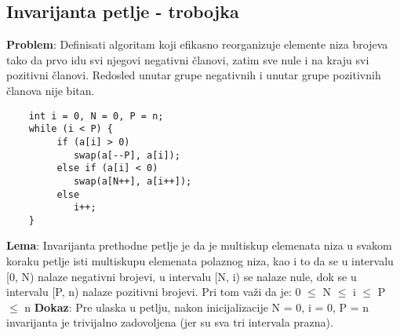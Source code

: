 \documentclass{article}
\begin{document}
\subsection{Invarijanta petlje - trobojka}
\textbf{Problem}: Definisati algoritam koji efikasno reorganizuje elemente niza brojeva tako da prvo idu svi njegovi negativni članovi, zatim sve nule i na kraju svi pozitivni članovi. Redosled unutar grupe negativnih i unutar grupe pozitivnih članova nije bitan. 
\begin{lstlisting}
    int i = 0, N = 0, P = n; 
    while (i < P) { 
	     if (a[i] > 0) 
    		swap(a[--P], a[i]); 
	     else if (a[i] < 0) 
    		swap(a[N++], a[i++]); 
	     else 
    		i++;
    }
\end{lstlisting}
\newline
\textbf{Lema}: Invarijanta prethodne petlje je da je multiskup elemenata niza u svakom koraku petlje isti multiskupu elemenata polaznog niza, kao i to da se u intervalu [0, N) nalaze negativni brojevi, u intervalu [N, i) se nalaze nule, dok se u intervalu [P, n) nalaze pozitivni brojevi. Pri tom važi da je: 0 $\leq$ N $\leq$ i $\leq$ P $\leq$ n
\vspace{0.2cm}	\newline
\hspace*{0.4cm}\textbf{Dokaz}:
\newline \hspace*{0.8cm}Pre ulaska u petlju, nakon inicijalizacije N = 0, i = 0, P = n invarijanta \hspace*{0.8cm}je trivijalno 		zadovoljena (jer su sva tri intervala prazna).
\end{document}
